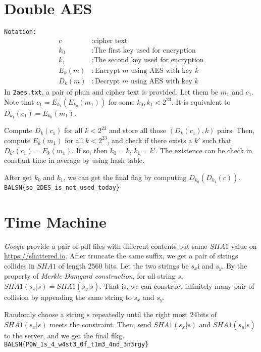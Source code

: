 \documentclass[12pt,a4paper]{article}
\begin{document}
\section{Double AES}
    \texttt{Notation: }
    \begin{align*}
        c&: \text{cipher text}\\
        k_0&: \text{The first key used for encryption}\\
        k_1&: \text{The second key used for encryption}\\
        E_k(m)&: \text{Encrypt $m$ using AES with key $k$}\\
        D_k(m)&: \text{Decrypt $m$ using AES with key $k$}
    \end{align*}
    In \texttt{2aes.txt}, a pair of plain and cipher text is provided. Let them be $m_1$ and $c_1$. Note that $c_1=E_{k_1}(E_{k_0}(m_1))$ for some $k_0, k_1 < 2^23$. It is equivalent to $D_{k_1}(c_1)=E_{k_0}(m_1)$.

    Compute $D_{k}(c_1)$ for all $k<2^{23}$ and store all those $(D_{k}(c_1), k)$ pairs. Then, compute $E_{k}(m_1)$ for all $k<2^{23}$, and check if there exists a $k'$ such that $D_{k'}(c_1)=E_{k}(m_1)$. If so, then $k_0=k$, $k_1=k'$. The existence can be check in constant time in average by using hash table.

    After get $k_0$ and $k_1$, we can get the final flag by computing $D_{k_0}(D_{k_1}(c))$.\\
\texttt{BALSN\{so\_2DES\_is\_not\_used\_today\}}

\section{Time Machine}
    \textit{Google} provide a pair of pdf files with different contents but same $SHA1$ value on \url{https://shattered.io}. After truncate the same suffix, we get a pair of strings collides in $SHA1$ of length $2560$ bits. Let the two strings be $s_x$i and $s_y$.
    By the property of \textit{Merkle Damgard construction}, for all string $s$, $SHA1(s_x|s)=SHA1(s_y|s)$. That is, we can construct infinitely many pair of collision by appending the same string to $s_x$ and $s_y$.

    Randomly choose a string $s$ repeatedly until the right most 24bits of $SHA1(s_x|s)$ meets the constraint. Then, send $SHA1(s_x|s)$ and $SHA1(s_y|s)$ to the server, and we get the final flkg.\\
\texttt{BALSN\{P0W\_1s\_4\_w4st3\_0f\_t1m3\_4nd\_3n3rgy\}}
\end{document}
